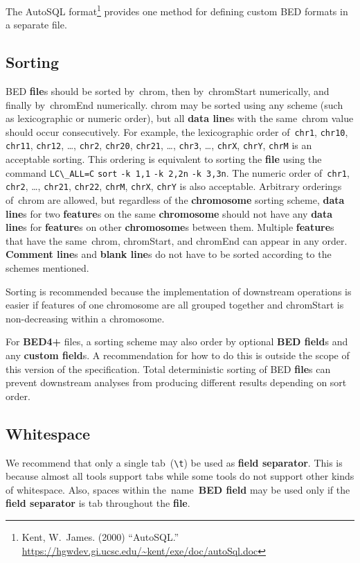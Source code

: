 \documentclass[11pt]{article}
\providecommand*{\Ac}[1]{\ac{#1}} %
\begin{document}
The AutoSQL format\footnote{Kent, W.~James.
  (2000) ``AutoSQL.''
  \url{https://hgwdev.gi.ucsc.edu/~kent/exe/doc/autoSql.doc}} provides one method for defining custom \ac{BED} formats in a separate file.

\subsection{Sorting}
\Ac{BED} \textbf{file}s should be sorted by~\textsf{chrom}, then by~\textsf{chromStart} numerically, and finally by~\textsf{chromEnd} numerically.
\textsf{chrom} may be sorted using any scheme (such as lexicographic or numeric order), but all \textbf{data line}s with the same~\textsf{chrom} value should occur consecutively.
For example, the lexicographic order of~\texttt{chr1}, \texttt{chr10}, \texttt{chr11}, \texttt{chr12}, {\ldots}, \texttt{chr2}, \texttt{chr20}, \texttt{chr21}, {\ldots}, \texttt{chr3}, {\ldots}, \texttt{chrX}, \texttt{chrY}, \texttt{chrM} is an acceptable sorting.
This ordering is equivalent to sorting the \textbf{file} using the command \verb|LC\_ALL=C| \verb|sort| \verb|-k 1,1| \verb|-k 2,2n| \verb|-k 3,3n|.
The numeric order of~\texttt{chr1}, \texttt{chr2}, {\ldots}, \texttt{chr21}, \texttt{chr22}, \texttt{chrM}, \texttt{chrX}, \texttt{chrY} is also acceptable.
Arbitrary orderings of~\textsf{chrom} are allowed, but regardless of the \textbf{chromosome} sorting scheme, \textbf{data line}s for two \textbf{feature}s on the same \textbf{chromosome} should not have any \textbf{data line}s for \textbf{feature}s on other \textbf{chromosome}s between them.
Multiple \textbf{feature}s that have the same~\textsf{chrom}, \textsf{chromStart}, and \textsf{chromEnd} can appear in any order.
\textbf{Comment line}s and \textbf{blank line}s do not have to be sorted according to the schemes mentioned.

Sorting is recommended because the implementation of downstream operations is easier if features of one chromosome are all grouped together and \textsf{chromStart} is non-decreasing within a chromosome.

For \textbf{BED4+} files, a sorting scheme may also order by optional \textbf{\acs{BED} field}s and any \textbf{custom field}s.
A recommendation for how to do this is outside the scope of this version of the specification.
Total deterministic sorting of \ac{BED} \textbf{file}s can prevent downstream analyses from producing different results depending on sort order.

\subsection{Whitespace}\label{sec:whitespace}
We recommend that only a single tab~(\texttt{{\textbackslash}t}) be used as \textbf{field separator}.
This is because almost all tools support tabs while some tools do not support other kinds of whitespace.
Also, spaces within the~\textsf{name}~\textbf{\acs{BED} field} may be used only if the \textbf{field separator} is tab throughout the \textbf{file}.
\end{document}
